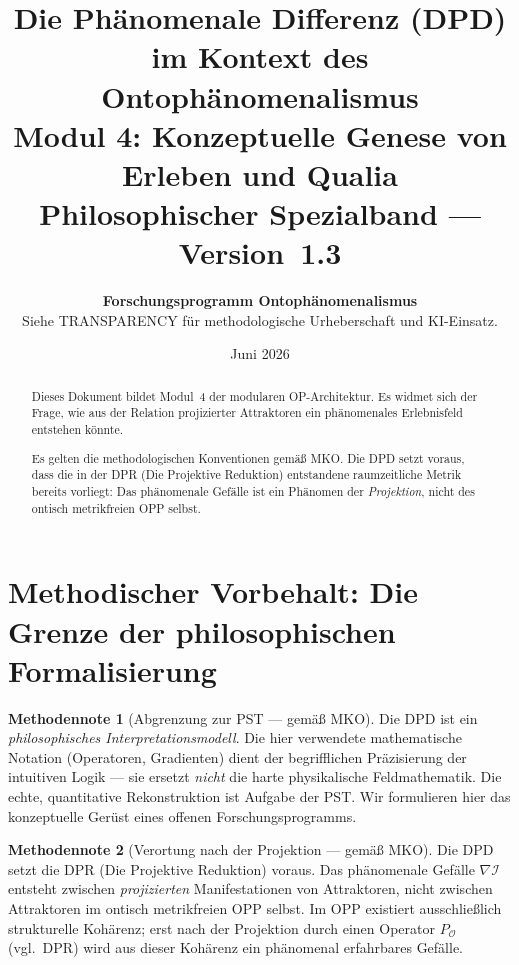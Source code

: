 \documentclass[11pt,a4paper]{article}
\title{
  \textbf{Die Ph\"{a}nomenale Differenz (DPD)}\\
  \textbf{im Kontext des Ontoph\"{a}nomenalismus}\\[0.4em]
  {\large Modul 4: Konzeptuelle Genese von Erleben und Qualia}\\[0.5em]
  {\normalsize Philosophischer Spezialband --- Version~1.3}
}
\author{
  \textbf{Forschungsprogramm Ontoph\"{a}nomenalismus}\\
  \small Siehe TRANSPARENCY f\"{u}r methodologische Urheberschaft und KI-Einsatz.
}
\date{Juni 2026}
\theoremstyle{plain}
\theoremstyle{definition}
\newtheorem{methodennote}{Methodennote}[section]
\begin{document}
\maketitle

\begin{abstract}
Dieses Dokument bildet Modul~4 der modularen OP-Architektur. Es widmet sich der Frage,
wie aus der Relation projizierter Attraktoren ein ph\"{a}nomenales Erlebnisfeld
entstehen k\"{o}nnte.

Es gelten die methodologischen Konventionen gem\"{a}\ss{} MKO. Die DPD setzt
voraus, dass die in der DPR (Die Projektive Reduktion) entstandene raumzeitliche
Metrik bereits vorliegt: Das ph\"{a}nomenale Gef\"{a}lle ist ein Ph\"{a}nomen der
\emph{Projektion}, nicht des ontisch metrikfreien OPP selbst.
\end{abstract}

\tableofcontents
\newpage

\section{Methodischer Vorbehalt: Die Grenze der philosophischen Formalisierung}

\begin{methodennote}[Abgrenzung zur PST --- gem\"{a}\ss{} MKO]
Die DPD ist ein \emph{philosophisches Interpretationsmodell}. Die hier verwendete
mathematische Notation (Operatoren, Gradienten) dient der begrifflichen
Pr\"{a}zisierung der intuitiven Logik --- sie ersetzt \emph{nicht} die harte
physikalische Feldmathematik. Die echte, quantitative Rekonstruktion ist Aufgabe der
PST. Wir formulieren hier das konzeptuelle Ger\"{u}st eines offenen
Forschungsprogramms.
\end{methodennote}

\begin{methodennote}[Verortung nach der Projektion --- gem\"{a}\ss{} MKO]
Die DPD setzt die DPR (Die Projektive Reduktion) voraus. Das ph\"{a}nomenale Gef\"{a}lle
$\nabla \mathcal{I}$ entsteht zwischen \emph{projizierten} Manifestationen von
Attraktoren, nicht zwischen Attraktoren im ontisch metrikfreien OPP selbst. Im OPP
existiert ausschlie\ss{}lich strukturelle Koh\"{a}renz; erst nach der Projektion durch
einen Operator $P_{\mathcal{O}}$ (vgl.\ DPR) wird aus dieser Koh\"{a}renz ein
ph\"{a}nomenal erfahrbares Gef\"{a}lle.
\end{methodennote}
\end{document}
